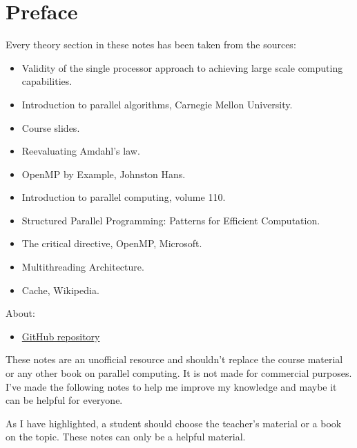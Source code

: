 \section*{Preface}

Every theory section in these notes has been taken from the sources:
\begin{itemize}
    \item Validity of the single processor approach to achieving large scale computing capabilities.\cite{amdahl2007validity}
    \item Introduction to parallel algorithms, Carnegie Mellon University.\cite{introductionToParallelAlgorithmsUMD}
    \item Course slides.\cite{parallel-computing-polimi}
    \item Reevaluating Amdahl's law.\cite{gustafson1988reevaluating}
    \item OpenMP by Example, Johnston Hans.\cite{whatIsOpenMPumassJohnstonHans}
    \item Introduction to parallel computing, volume 110.\cite{kumar1994introduction}
    \item Structured Parallel Programming: Patterns for Efficient Computation.\cite{mccool2012structured}
    \item The critical directive, OpenMP, Microsoft.\cite{openMPCriticalDirectiveMicrosoftExample}
    \item Multithreading Architecture.\cite{nemirovsky2022multithreading}
    \item Cache, Wikipedia.\cite{wikipediaCacheResearch}
\end{itemize}
About:
\begin{itemize}
    \item[\faIcon{github}] \href{https://github.com/PoliMI-HPC-E-notes-projects-AndreVale69/HPC-E-PoliMI-university-notes}{GitHub repository}
\end{itemize}
These notes are an unofficial resource and shouldn't replace the course material or any other book on parallel computing. It is not made for commercial purposes. I've made the following notes to help me improve my knowledge and maybe it can be helpful for everyone.

As I have highlighted, a student should choose the teacher's material or a book on the topic. These notes can only be a helpful material.